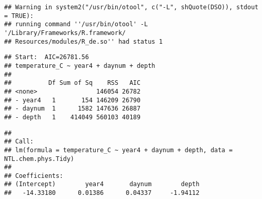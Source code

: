 \documentclass[]{article}
\newenvironment{Shaded}{\begin{snugshade}}{\end{snugshade}}
\newcommand{\KeywordTok}[1]{\textcolor[rgb]{0.13,0.29,0.53}{\textbf{#1}}}
\newcommand{\DataTypeTok}[1]{\textcolor[rgb]{0.13,0.29,0.53}{#1}}
\newcommand{\DecValTok}[1]{\textcolor[rgb]{0.00,0.00,0.81}{#1}}
\newcommand{\StringTok}[1]{\textcolor[rgb]{0.31,0.60,0.02}{#1}}
\newcommand{\CommentTok}[1]{\textcolor[rgb]{0.56,0.35,0.01}{\textit{#1}}}
\newcommand{\OperatorTok}[1]{\textcolor[rgb]{0.81,0.36,0.00}{\textbf{#1}}}
\newcommand{\NormalTok}[1]{#1}
\begin{document}
\begin{Shaded}
\end{Shaded}

\begin{verbatim}
## Warning in system2("/usr/bin/otool", c("-L", shQuote(DSO)), stdout = TRUE):
## running command ''/usr/bin/otool' -L '/Library/Frameworks/R.framework/
## Resources/modules/R_de.so'' had status 1
\end{verbatim}

\begin{Shaded}
\end{Shaded}

\begin{verbatim}
## Start:  AIC=26781.56
## temperature_C ~ year4 + daynum + depth
## 
##          Df Sum of Sq    RSS   AIC
## <none>                146054 26782
## - year4   1       154 146209 26790
## - daynum  1      1582 147636 26887
## - depth   1    414049 560103 40189
\end{verbatim}

\begin{verbatim}
## 
## Call:
## lm(formula = temperature_C ~ year4 + daynum + depth, data = NTL.chem.phys.Tidy)
## 
## Coefficients:
## (Intercept)        year4       daynum        depth  
##   -14.33180      0.01386      0.04337     -1.94112
\end{verbatim}
\end{document}
